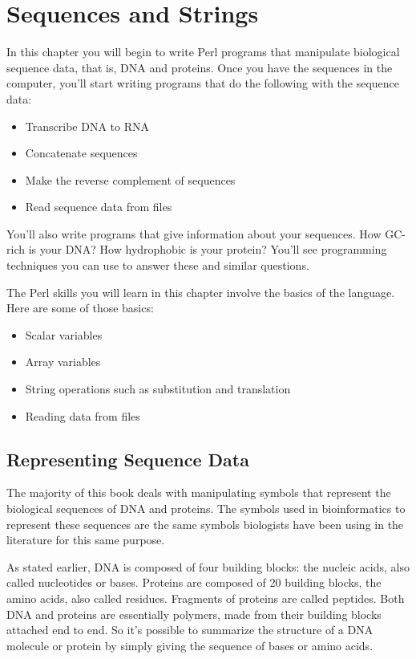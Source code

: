 \chapter{Sequences and Strings}
\label{chap:chapter4}
\minitoc


In this chapter you will begin to write Perl programs that manipulate biological sequence data, that is, DNA and proteins. Once you have the sequences in the computer, you'll start writing programs that do the following with the sequence data:

\begin{itemize}
  \item Transcribe DNA to RNA
  \item Concatenate sequences
  \item Make the reverse complement of sequences
  \item Read sequence data from files
\end{itemize}

You'll also write programs that give information about your sequences. How GC-rich is your DNA? How hydrophobic is your protein? You'll see programming techniques you can use to answer these and similar questions.

The Perl skills you will learn in this chapter involve the basics of the language. Here are some of those basics:

\begin{itemize}
  \item Scalar variables
  \item Array variables
  \item String operations such as substitution and translation
  \item Reading data from files
\end{itemize}

\section{Representing Sequence Data}
The majority of this book deals with manipulating symbols that represent the biological sequences of DNA and proteins. The symbols used in bioinformatics to represent these sequences are the same symbols biologists have been using in the literature for this same purpose.

As stated earlier, DNA is composed of four building blocks: the nucleic acids, also called nucleotides or bases. Proteins are composed of 20 building blocks, the amino acids, also called residues. Fragments of proteins are called peptides. Both DNA and proteins are essentially polymers, made from their building blocks attached end to end. So it's possible to summarize the structure of a DNA molecule or protein by simply giving the sequence of bases or amino acids.

